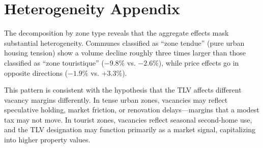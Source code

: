 \documentclass[12pt]{article}
\begin{document}
\section{Heterogeneity Appendix}\label{app:heterogeneity}

The decomposition by zone type reveals that the aggregate effects mask substantial heterogeneity. Communes classified as ``zone tendue'' (pure urban housing tension) show a volume decline roughly three times larger than those classified as ``zone touristique'' ($-9.8\%$ vs. $-2.6\%$), while price effects go in opposite directions ($-1.9\%$ vs. $+3.3\%$).

This pattern is consistent with the hypothesis that the TLV affects different vacancy margins differently. In tense urban zones, vacancies may reflect speculative holding, market friction, or renovation delays---margins that a modest tax may not move. In tourist zones, vacancies reflect seasonal second-home use, and the TLV designation may function primarily as a market signal, capitalizing into higher property values.
\end{document}
